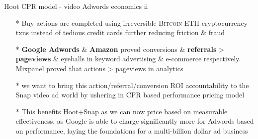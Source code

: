 \documentclass[10pt,handout]{beamer}
\begin{document}
\begin{frame}[t]{Hoot CPR model - video Adwords economics ii}
\begin{itemize}[<+-| alert@+>]

\item[*]Buy actions are completed using irreversible \textsc{Bitcoin ETH} cryptocurrency txns instead of tedious credit cards further reducing friction \& fraud
\item[*]\textbf{Google Adwords} \& \textbf{Amazon} proved conversions \& \textbf{referrals} > \textbf{pageviews} \& eyeballs in keyword advertising \& e-commerce respectively. Mixpanel proved that actions > pageviews in analytics
\item[*]we want to bring this action/referral/conversion ROI accountability to the Snap video ad world by ushering in CPR based performance pricing model
\item[*]This benefits Hoot+Snap as we can now price based on measurable effectiveness, as Google is able to charge significantly more for Adwords based on performance, laying the foundations for a multi-billion dollar ad business

\end{itemize}
\end{frame}
\end{document}
